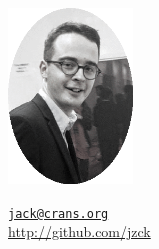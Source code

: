\begin{minipage}{.25\textwidth}
	\includegraphics[width=33mm]{img/jack.png}
\end{minipage}%
\begin{minipage}{.7\textwidth}
	\vspace{2em}
		\center
		\large{\faEnvelope} \textcolor{orange}{\href{mailto:jack@crans.org}{\texttt{jack@crans.org}}}\\
		\large{\faGithub} \textcolor{cyan}{\url{http://github.com/jzck}}\\
\end{minipage}

\vspace{4mm}
